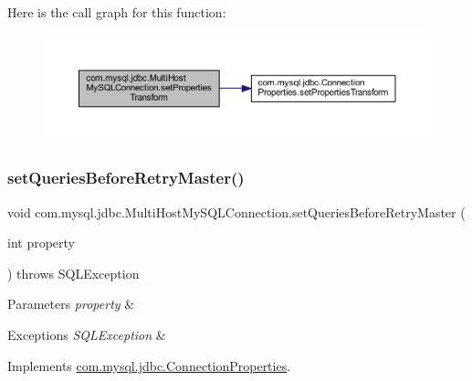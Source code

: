 Here is the call graph for this function\+:
\nopagebreak
\begin{figure}[H]
\begin{center}
\leavevmode
\includegraphics[width=350pt]{classcom_1_1mysql_1_1jdbc_1_1_multi_host_my_s_q_l_connection_ab99171be57dd6ce8597774c664e46136_cgraph}
\end{center}
\end{figure}
\mbox{\label{classcom_1_1mysql_1_1jdbc_1_1_multi_host_my_s_q_l_connection_abb525c1cf46936e3754abab5a8a83997}} 
\subsubsection{\texorpdfstring{set\+Queries\+Before\+Retry\+Master()}{setQueriesBeforeRetryMaster()}}
{\footnotesize\ttfamily void com.\+mysql.\+jdbc.\+Multi\+Host\+My\+S\+Q\+L\+Connection.\+set\+Queries\+Before\+Retry\+Master (\begin{DoxyParamCaption}\item[{int}]{property }\end{DoxyParamCaption}) throws S\+Q\+L\+Exception}


\begin{DoxyParams}{Parameters}
{\em property} & \\
\hline
\end{DoxyParams}

\begin{DoxyExceptions}{Exceptions}
{\em S\+Q\+L\+Exception} & \\
\hline
\end{DoxyExceptions}


Implements \mbox{\hyperlink{interfacecom_1_1mysql_1_1jdbc_1_1_connection_properties_a957986bd12af4715d9b9bb097109a61b}{com.\+mysql.\+jdbc.\+Connection\+Properties}}.

